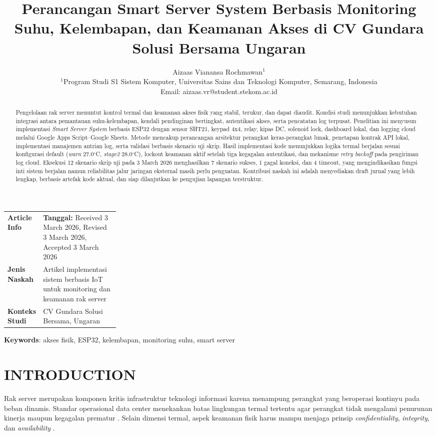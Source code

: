 \documentclass[10pt,a4paper,twocolumn]{article}
\title{\textbf{Perancangan Smart Server System Berbasis Monitoring Suhu, Kelembapan, dan Keamanan Akses di CV Gundara Solusi Bersama Ungaran}}
\author{
Aizaas Vianansa Rochmawan$^{1}$ \\
$^{1}$Program Studi S1 Sistem Komputer, Universitas Sains dan Teknologi Komputer, Semarang, Indonesia \\
Email: aizaas.vr@student.stekom.ac.id
}
\date{}
\begin{document}
\maketitle
\thispagestyle{plain}

\begin{center}
\small
\begin{tabularx}{0.96\linewidth}{p{0.26\linewidth}Y}
\textbf{Article Info} & \textbf{Tanggal:} Received 3 March 2026, Revised 3 March 2026, Accepted 3 March 2026 \\
\textbf{Jenis Naskah} & Artikel implementasi sistem berbasis IoT untuk monitoring dan keamanan rak server \\
\textbf{Konteks Studi} & CV Gundara Solusi Bersama, Ungaran \\
\end{tabularx}
\end{center}

\begin{abstract}
Pengelolaan rak server menuntut kontrol termal dan keamanan akses fisik yang stabil, terukur, dan dapat diaudit. Kondisi studi menunjukkan kebutuhan integrasi antara pemantauan suhu-kelembapan, kendali pendinginan bertingkat, autentikasi akses, serta pencatatan log terpusat. Penelitian ini menyusun implementasi \textit{Smart Server System} berbasis ESP32 dengan sensor SHT21, keypad 4x4, relay, kipas DC, solenoid lock, dashboard lokal, dan logging cloud melalui Google Apps Script--Google Sheets. Metode mencakup perancangan arsitektur perangkat keras-perangkat lunak, penetapan kontrak API lokal, implementasi manajemen antrian log, serta validasi berbasis skenario uji skrip. Hasil implementasi kode menunjukkan logika termal berjalan sesuai konfigurasi default (\textit{warn} 27.0$^\circ$C, \textit{stage2} 28.0$^\circ$C), lockout keamanan aktif setelah tiga kegagalan autentikasi, dan mekanisme \textit{retry backoff} pada pengiriman log cloud. Eksekusi 12 skenario skrip uji pada 3 March 2026 menghasilkan 7 skenario sukses, 1 gagal koneksi, dan 4 timeout, yang mengindikasikan fungsi inti sistem berjalan namun reliabilitas jalur jaringan eksternal masih perlu penguatan. Kontribusi naskah ini adalah menyediakan draft jurnal yang lebih lengkap, berbasis artefak kode aktual, dan siap dilanjutkan ke pengujian lapangan terstruktur.
\end{abstract}

\textbf{Keywords}: akses fisik, ESP32, kelembapan, monitoring suhu, smart server

\section{INTRODUCTION}
Rak server merupakan komponen kritis infrastruktur teknologi informasi karena menampung perangkat yang beroperasi kontinyu pada beban dinamis. Standar operasional data center menekankan batas lingkungan termal tertentu agar perangkat tidak mengalami penurunan kinerja maupun kegagalan prematur \cite{ashrae2021,tia942}. Selain dimensi termal, aspek keamanan fisik harus mampu menjaga prinsip \textit{confidentiality}, \textit{integrity}, dan \textit{availability} \cite{stallings2017}.
\end{document}
